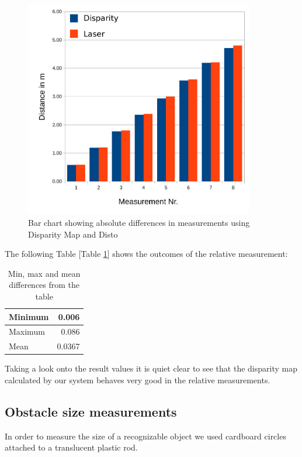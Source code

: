 \documentclass[11pt]{article}
\begin{document}
\begin{figure}[H]
        \centering
        \includegraphics[width=10cm]{images/relative-measurements.pdf}
        \caption{Bar chart showing absolute differences in measurements using Disparity Map and Disto}
        \label{fig:relative-chart}
\end{figure}

The following Table [Table \ref{table:relative-results}] shows the outcomes of the relative measurement:

\begin{table}[htbp]
	\begin{center}
	\begin{tabular}{|l|r|}
	\hline
	Minimum & 0.006 \\ \hline
	Maximum & 0.086 \\ \hline
	Mean & 0.0367 \\ \hline
	\end{tabular}
	\end{center}
	\caption{Min, max and mean differences from the table}
	\label{table:relative-results}
\end{table}

Taking a look onto the result values it is quiet clear to see that the disparity map calculated by our system behaves very good in the relative measurements.


\subsection{Obstacle size measurements}
In order to measure the size of a recognizable object we used cardboard circles attached to a translucent plastic rod.
\end{document}
